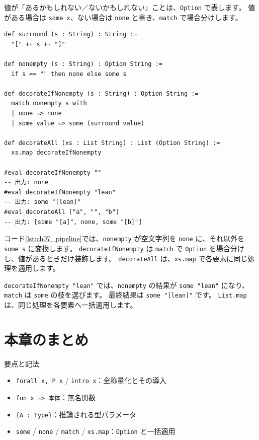 値が「あるかもしれない／ないかもしれない」ことは、\texttt{Option} で表します。
値がある場合は \texttt{some x}、ない場合は \texttt{none} と書き、\texttt{match} で場合分けします。

\begin{listing}[htbp]
\begin{verbatim}
def surround (s : String) : String :=
  "[" ++ s ++ "]"

def nonempty (s : String) : Option String :=
  if s == "" then none else some s

def decorateIfNonempty (s : String) : Option String :=
  match nonempty s with
  | none => none
  | some value => some (surround value)

def decorateAll (xs : List String) : List (Option String) :=
  xs.map decorateIfNonempty

#eval decorateIfNonempty ""
-- 出力: none
#eval decorateIfNonempty "lean"
-- 出力: some "[lean]"
#eval decorateAll ["a", "", "b"]
-- 出力: [some "[a]", none, some "[b]"]
\end{verbatim}
\caption{\texttt{decorateIfNonempty} と \texttt{decorateAll}}
\label{lst:ch07_pipeline}
\end{listing}

コード\ref{lst:ch07_pipeline}では、\texttt{nonempty} が空文字列を \texttt{none} に、それ以外を \texttt{some s} に変換します。
\texttt{decorateIfNonempty} は \texttt{match} で \texttt{Option} を場合分けし、値があるときだけ装飾します。
\texttt{decorateAll} は、\texttt{xs.map} で各要素に同じ処理を適用します。

\texttt{decorateIfNonempty "lean"} では、\texttt{nonempty} の結果が \texttt{some "lean"} になり、\texttt{match} は \texttt{some} の枝を選びます。
最終結果は \texttt{some "[lean]"} です。
\texttt{List.map} は、同じ処理を各要素へ一括適用します。

\section{本章のまとめ}

要点と記法
\begin{itemize}
\item \texttt{forall x, P x} / \texttt{intro x}：全称量化とその導入
\item \texttt{fun x => 本体}：無名関数
\item \texttt{\{A : Type\}}：推論される型パラメータ
\item \texttt{some} / \texttt{none} / \texttt{match} / \texttt{xs.map}：\texttt{Option} と一括適用
\end{itemize}
